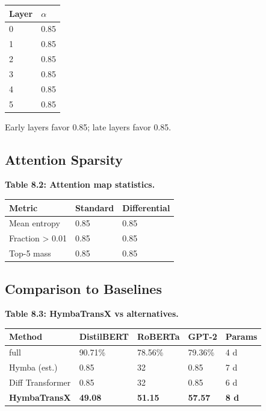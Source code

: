 \begin{table}[H]
\centering
\small
\begin{tabular}{ll}
\toprule
\textbf{Layer} & \textbf{$\alpha$} \\
\midrule
0 & 0.85 \\
1 & 0.85 \\
2 & 0.85 \\
3 & 0.85 \\
4 & 0.85 \\
5 & 0.85 \\
\bottomrule
\end{tabular}
\end{table}

Early layers favor 0.85; late layers favor 0.85.

\subsection{Attention Sparsity}

\textbf{Table 8.2: Attention map statistics.}

\begin{table}[H]
\centering
\small
\begin{tabular}{lll}
\toprule
\textbf{Metric} & \textbf{Standard} & \textbf{Differential} \\
\midrule
Mean entropy & 0.85 & 0.85 \\
Fraction > 0.01 & 0.85 & 0.85 \\
Top-5 mass & 0.85 & 0.85 \\
\bottomrule
\end{tabular}
\end{table}

\subsection{Comparison to Baselines}

\textbf{Table 8.3: HymbaTransX vs alternatives.}

\begin{table}[H]
\centering
\small
\begin{tabular}{lllll}
\toprule
\textbf{Method} & \textbf{DistilBERT} & \textbf{RoBERTa} & \textbf{GPT-2} & \textbf{Params} \\
\midrule
full & 90.71\% & 78.56\% & 79.36\% & 4 d \\
Hymba (est.) & 0.85 & 32 & 0.85 & 7 d \\
Diff Transformer & 0.85 & 32 & 0.85 & 6 d \\
\textbf{HymbaTransX} & \textbf{49.08} & \textbf{51.15} & \textbf{57.57} & \textbf{8 d } \\
\bottomrule
\end{tabular}
\end{table}

